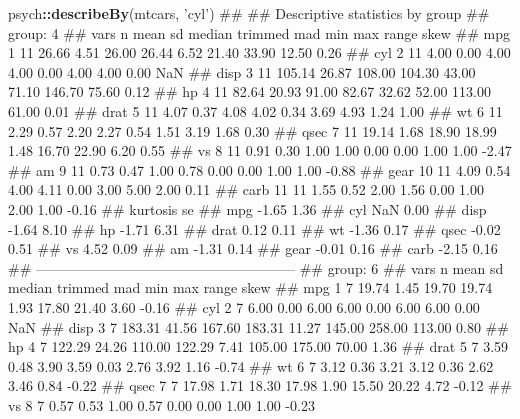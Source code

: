 \documentclass[]{article}
\newenvironment{Shaded}{\begin{snugshade}}{\end{snugshade}}
\newcommand{\KeywordTok}[1]{\textcolor[rgb]{0.13,0.29,0.53}{\textbf{#1}}}
\newcommand{\StringTok}[1]{\textcolor[rgb]{0.31,0.60,0.02}{#1}}
\newcommand{\OperatorTok}[1]{\textcolor[rgb]{0.81,0.36,0.00}{\textbf{#1}}}
\newcommand{\NormalTok}[1]{#1}
\theoremstyle{definition}
\theoremstyle{definition}
\theoremstyle{definition}
\theoremstyle{remark}
\begin{document}
\begin{Shaded}
\begin{Highlighting}[]
\NormalTok{psych}\OperatorTok{::}\KeywordTok{describeBy}\NormalTok{(mtcars, }\StringTok{'cyl'}\NormalTok{)}
\NormalTok{## }
\NormalTok{##  Descriptive statistics by group }
\NormalTok{## group: 4}
\NormalTok{##      vars  n   mean    sd median trimmed   mad   min    max range  skew}
\NormalTok{## mpg     1 11  26.66  4.51  26.00   26.44  6.52 21.40  33.90 12.50  0.26}
\NormalTok{## cyl     2 11   4.00  0.00   4.00    4.00  0.00  4.00   4.00  0.00   NaN}
\NormalTok{## disp    3 11 105.14 26.87 108.00  104.30 43.00 71.10 146.70 75.60  0.12}
\NormalTok{## hp      4 11  82.64 20.93  91.00   82.67 32.62 52.00 113.00 61.00  0.01}
\NormalTok{## drat    5 11   4.07  0.37   4.08    4.02  0.34  3.69   4.93  1.24  1.00}
\NormalTok{## wt      6 11   2.29  0.57   2.20    2.27  0.54  1.51   3.19  1.68  0.30}
\NormalTok{## qsec    7 11  19.14  1.68  18.90   18.99  1.48 16.70  22.90  6.20  0.55}
\NormalTok{## vs      8 11   0.91  0.30   1.00    1.00  0.00  0.00   1.00  1.00 -2.47}
\NormalTok{## am      9 11   0.73  0.47   1.00    0.78  0.00  0.00   1.00  1.00 -0.88}
\NormalTok{## gear   10 11   4.09  0.54   4.00    4.11  0.00  3.00   5.00  2.00  0.11}
\NormalTok{## carb   11 11   1.55  0.52   2.00    1.56  0.00  1.00   2.00  1.00 -0.16}
\NormalTok{##      kurtosis   se}
\NormalTok{## mpg     -1.65 1.36}
\NormalTok{## cyl       NaN 0.00}
\NormalTok{## disp    -1.64 8.10}
\NormalTok{## hp      -1.71 6.31}
\NormalTok{## drat     0.12 0.11}
\NormalTok{## wt      -1.36 0.17}
\NormalTok{## qsec    -0.02 0.51}
\NormalTok{## vs       4.52 0.09}
\NormalTok{## am      -1.31 0.14}
\NormalTok{## gear    -0.01 0.16}
\NormalTok{## carb    -2.15 0.16}
\NormalTok{## -------------------------------------------------------- }
\NormalTok{## group: 6}
\NormalTok{##      vars n   mean    sd median trimmed   mad    min    max  range  skew}
\NormalTok{## mpg     1 7  19.74  1.45  19.70   19.74  1.93  17.80  21.40   3.60 -0.16}
\NormalTok{## cyl     2 7   6.00  0.00   6.00    6.00  0.00   6.00   6.00   0.00   NaN}
\NormalTok{## disp    3 7 183.31 41.56 167.60  183.31 11.27 145.00 258.00 113.00  0.80}
\NormalTok{## hp      4 7 122.29 24.26 110.00  122.29  7.41 105.00 175.00  70.00  1.36}
\NormalTok{## drat    5 7   3.59  0.48   3.90    3.59  0.03   2.76   3.92   1.16 -0.74}
\NormalTok{## wt      6 7   3.12  0.36   3.21    3.12  0.36   2.62   3.46   0.84 -0.22}
\NormalTok{## qsec    7 7  17.98  1.71  18.30   17.98  1.90  15.50  20.22   4.72 -0.12}
\NormalTok{## vs      8 7   0.57  0.53   1.00    0.57  0.00   0.00   1.00   1.00 -0.23}

\end{Highlighting}
\end{Shaded}
\end{document}
